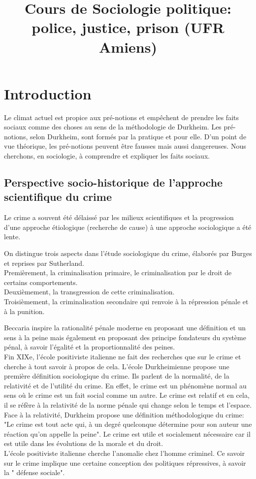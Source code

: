 \documentclass[10pt, a4paper, openany]{book}
\date{}
\title{Cours de Sociologie politique: police, justice, prison (UFR Amiens)}
\begin{document}
\maketitle
\tableofcontents

\chapter{Introduction}

Le climat actuel est propice aux pré-notions et empêchent de prendre les faits sociaux comme des choses au sens de la méthodologie de Durkheim. Les pré-notions, selon Durkheim, sont formés par la pratique et pour elle. D'un point de vue théorique, les pré-notions peuvent être fausses mais aussi dangereuses. Nous cherchons, en sociologie, à comprendre et expliquer les faits sociaux. \\

\section{Perspective socio-historique de l'approche scientifique du crime}

Le crime a souvent été délaissé par les milieux scientifiques et la progression d'une approche étiologique (recherche de cause) à une approche sociologique a été lente.  


On distingue trois aspects dans l'étude sociologique du crime, élaborés par Burges et reprises par Sutherland. \\
Premièrement, la criminalisation primaire, le criminalisation par le droit de certains comportements. \\
Deuxièmement, la transgression de cette criminalisation. \\
Troisièmement, la criminalisation secondaire qui renvoie à la répression pénale et à la punition. 


Beccaria inspire la rationalité pénale moderne en proposant une définition et un sens à la peine mais également en proposant des principe fondateurs du système pénal, à savoir l'égalité et la proportionnalité des peines. \\
Fin XIXe, l'école positiviste italienne ne fait des recherches que sur le crime et cherche à tout savoir à propos de cela. L'école Durkheimienne propose une première définition sociologique du crime. Ils parlent de la normalité, de la relativité et de l'utilité du crime. En effet, le crime est un phénomène normal au sens où le crime est un fait social comme un autre. Le crime est relatif et en cela, il se réfère à la relativité de la norme pénale qui change selon le temps et l'espace. Face à la relativité, Durkheim propose une définition méthodologique du crime: "Le crime est tout acte qui, à un degré quelconque détermine pour son auteur une réaction qu'on appelle la peine". Le crime est utile et socialement nécessaire car il est utile dans les évolutions de la morale et du droit. \\
L'école positiviste italienne cherche l'anomalie chez l'homme criminel. Ce savoir sur le crime implique une certaine conception des politiques répressives, à savoir la " défense sociale". 
\end{document}
